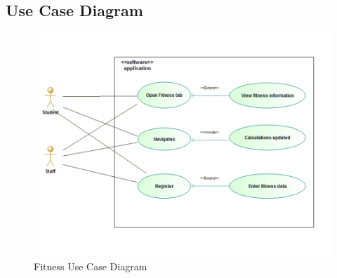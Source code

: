 \newpage

\subsection{Use Case Diagram}
\begin{figure}[H]
	\centering
	\includegraphics[scale=0.54]{Fitness/fitness_use_case_diagram.png}
	\caption{Fitness Use Case Diagram}
	\label{fig:Fitness_Use_Case_Diagram}
\end{figure}